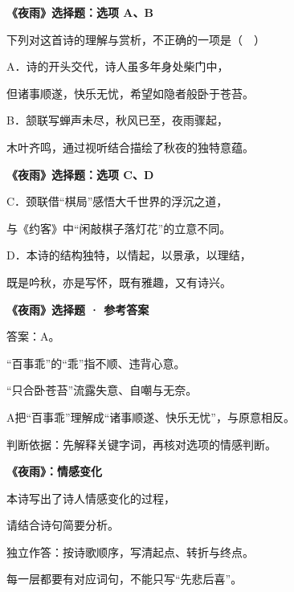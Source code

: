 \documentclass[UTF8,10pt,aspectratio=169]{ctexbeamer}
\newcommand{\PageHeading}[1]{\begin{center}{\Large\bfseries #1}\end{center}\vspace{0.2cm}}
\begin{document}
\begin{frame}
\PageHeading{《夜雨》选择题：选项 A、B}
下列对这首诗的理解与赏析，不正确的一项是（　）\par\vspace{0.23cm}
A．诗的开头交代，诗人虽多年身处柴门中，\par\vspace{0.23cm}
但诸事顺遂，快乐无忧，希望如隐者般卧于苍苔。\par\vspace{0.23cm}
B．颔联写蝉声未尽，秋风已至，夜雨骤起，\par\vspace{0.23cm}
木叶齐鸣，通过视听结合描绘了秋夜的独特意蕴。\par\vspace{0.23cm}
\end{frame}
\begin{frame}
\PageHeading{《夜雨》选择题：选项 C、D}
C．颈联借“棋局”感悟大千世界的浮沉之道，\par\vspace{0.23cm}
与《约客》中“闲敲棋子落灯花”的立意不同。\par\vspace{0.23cm}
D．本诗的结构独特，以情起，以景承，以理结，\par\vspace{0.23cm}
既是吟秋，亦是写怀，既有雅趣，又有诗兴。\par\vspace{0.23cm}
\end{frame}
\begin{frame}
\PageHeading{《夜雨》选择题 · 参考答案}
答案：A。\par\vspace{0.23cm}
“百事乖”的“乖”指不顺、违背心意。\par\vspace{0.23cm}
“只合卧苍苔”流露失意、自嘲与无奈。\par\vspace{0.23cm}
A把“百事乖”理解成“诸事顺遂、快乐无忧”，与原意相反。\par\vspace{0.23cm}
判断依据：先解释关键字词，再核对选项的情感判断。\par\vspace{0.23cm}
\end{frame}
\begin{frame}
\PageHeading{《夜雨》：情感变化}
本诗写出了诗人情感变化的过程，\par\vspace{0.23cm}
请结合诗句简要分析。\par\vspace{0.23cm}
独立作答：按诗歌顺序，写清起点、转折与终点。\par\vspace{0.23cm}
每一层都要有对应词句，不能只写“先悲后喜”。\par\vspace{0.23cm}
\end{frame}
\end{document}
